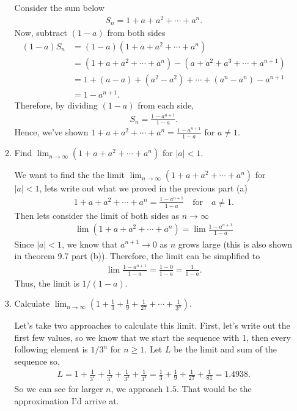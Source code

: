 \documentclass [10pt]{article}
\newcommand{\jg}[1]{{\color{blue} #1}}
\begin{document}
\begin{enumerate}
\begin{enumerate}
{Consider the sum below
\begin{align*}
    S_n = 1 + a + a^2 + \cdots + a^n.
\end{align*}
Now, subtract $(1-a)$ from both sides
\begin{align*}
    (1-a) S_n &= (1-a)(1 + a + a^2 + \cdots + a^n) \\
    &= (1 + a + a^2 + \cdots + a^n) - (a + a^2 + a^3 + \cdots + a^{n+1}) \\
    &= 1 + (a-a) + (a^2 - a^2) + \cdots + (a^n - a^n) - a^{n+1} \\
    &= 1 - a^{n+1}. 
\end{align*}
Therefore, by dividing $(1-a)$ from each side,
\begin{align*}
    S_n = \frac{1-a^{n+1}}{1-a}. 
\end{align*}
Hence, we've shown $1 + a + a^2 + \cdots + a^n = \frac{1-a^{n+1}}{1-a}$ for $a \neq 1$. 
}

\item Find $\lim_{n \to \infty} (1 + a + a^2 + \cdots + a^n)$ for $|a| < 1$.

\jg{
We want to find the the limit $\lim_{n \to \infty} (1 + a + a^2 + \cdots + a^n)$ for $|a| < 1$, lets write out what we proved in the previous part (a)
\begin{align*}
    1 + a + a^2 + \cdots + a^n = \frac{1-a^{n+1}}{1-a} \quad \text{for} \quad a \neq 1. 
\end{align*}
Then lets consider the limit of both sides as $n \rightarrow \infty$
\begin{align*}
    \lim (1 + a + a^2 + \cdots + a^n)= \lim \frac{1-a^{n+1}}{1-a}
\end{align*}
Since $|a| < 1$, we know that $a^{n+1} \rightarrow 0$ as $n$ grows large (this is also shown in theorem 9.7 part (b)). Therefore, the limit can be simplified to
\begin{align*}
    \lim \frac{1-a^{n+1}}{1-a} = \frac{1-0}{1-a} = \frac{1}{1-a}. 
\end{align*}
Thus, the limit is $1/(1-a)$. 
}
\item Calculate $\lim_{n\to \infty}(1 + \frac{1}{3} + \frac{1}{9} + \frac{1}{27} + \cdots + \frac{1}{3^n})$.

\jg{
Let's take two approaches to calculate this limit. First, let's write out the first few values, so we know that we start the sequence with 1, then every following element is $1/3^n$ for $n \geq 1$. Let $L$ be the limit and sum of the sequence so, 
\begin{align*}
    L = 1 + \frac{1}{3^1} + \frac{1}{3^2} + \frac{1}{3^3} + \frac{1}{3^4} = \frac{1}{3} + \frac{1}{9} + \frac{1}{27} + \frac{1}{81} = 1.4938.
\end{align*}
So we can see for larger $n$, we approach $1.5$. That would be the approximation I'd arrive at.

}
\end{enumerate}
\end{enumerate}
\end{document}
